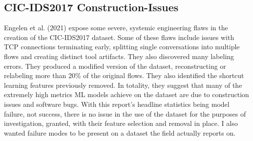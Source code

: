 \documentclass{article}
\begin{document}
\begin{appendices}
\section{CIC-IDS2017 Construction-Issues}
Engelen et al. (2021)\parencite{engelen2021troubleshooting} expose some severe, systemic engineering flaws in the creation of the CIC-IDS2017 dataset. Some of these flaws include issues with TCP connections terminating early, splitting single conversations into multiple flows and creating distinct tool artifacts. They also discovered many labeling errors. They produced a modified version of the dataset, reconstructing or relabeling more than 20\% of the original flows. They also identified the shortcut learning features previously removed. In totality, they suggest that many of the extremely high metrics ML models achieve on the dataset are due to construction issues and software bugs. With this report's headline statistics being model failure, not success, there is no issue in the use of the dataset for the purposes of investigation, granted, with their feature selection and removal in place. I also wanted failure modes to be present on a dataset the field actually reports on.
\end{appendices}
\printbibliography
\end{document}
